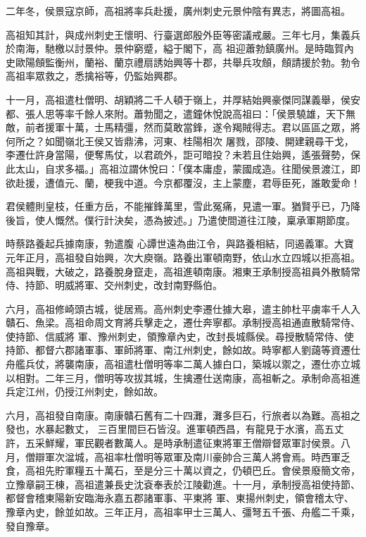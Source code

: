 \begin{pinyinscope}
 二年冬，侯景寇京師，高祖將率兵赴援，廣州刺史元景仲陰有異志，將圖高祖。



 高祖知其計，與成州刺史王懷明、行臺選郎殷外臣等密議戒嚴。三年七月，集義兵於南海，馳檄以討景仲。景仲窮蹙，縊于閣下，高
 祖迎蕭勃鎮廣州。是時臨賀內史歐陽頠監衡州，蘭裕、蘭京禮扇誘始興等十郡，共舉兵攻頠，頠請援於勃。勃令高祖率眾救之，悉擒裕等，仍監始興郡。



 十一月，高祖遣杜僧明、胡穎將二千人頓于嶺上，并厚結始興豪傑同謀義舉，侯安都、張人思等率千餘人來附。蕭勃聞之，遣鐘休悅說高祖曰：「侯景驍雄，天下無敵，前者援軍十萬，士馬精彊，然而莫敢當鋒，遂令羯賊得志。君以區區之眾，將何所之？如聞嶺北王侯又皆鼎沸，河東、桂陽相次
 屠戮，邵陵、開建親尋干戈，李遷仕許身當陽，便奪馬仗，以君疏外，詎可暗投？未若且住始興，遙張聲勢，保此太山，自求多福。」高祖泣謂休悅曰：「僕本庸虛，蒙國成造。往聞侯景渡江，即欲赴援，遭值元、蘭，梗我中道。今京都覆沒，主上蒙塵，君辱臣死，誰敢愛命！



 君侯體則皇枝，任重方岳，不能摧鋒萬里，雪此冤痛，見遣一軍。猶賢乎已，乃降後旨，使人慨然。僕行計決矣，憑為披述。」乃遣使間道往江陵，稟承軍期節度。



 時蔡路養起兵據南康，勃遣腹
 心譚世遠為曲江令，與路養相結，同遏義軍。大寶元年正月，高祖發自始興，次大庾嶺。路養出軍頓南野，依山水立四城以拒高祖。高祖與戰，大破之，路養脫身竄走，高祖進頓南康。湘東王承制授高祖員外散騎常侍、持節、明威將軍、交州刺史，改封南野縣伯。



 六月，高祖修崎頭古城，徙居焉。高州刺史李遷仕據大皋，遣主帥杜平虜率千人入贛石、魚梁。高祖命周文育將兵擊走之，遷仕奔寧都。承制授高祖通直散騎常侍、使持節、信威將
 軍、豫州刺史，領豫章內史，改封長城縣侯。尋授散騎常侍、使持節、都督六郡諸軍事、軍師將軍、南江州刺史，餘如故。時寧都人劉藹等資遷仕舟艦兵仗，將襲南康，高祖遣杜僧明等率二萬人據白口，築城以禦之，遷仕亦立城以相對。二年三月，僧明等攻拔其城，生擒遷仕送南康，高祖斬之。承制命高祖進兵定江州，仍授江州刺史，餘如故。



 六月，高祖發自南康。南康贛石舊有二十四灘，灘多巨石，行旅者以為難。高祖之發也，水暴起數丈，
 三百里間巨石皆沒。進軍頓西昌，有龍見于水濱，高五丈許，五采鮮耀，軍民觀者數萬人。是時承制遣征東將軍王僧辯督眾軍討侯景。八月，僧辯軍次湓城，高祖率杜僧明等眾軍及南川豪帥合三萬人將會焉。時西軍乏食，高祖先貯軍糧五十萬石，至是分三十萬以資之，仍頓巴丘。會侯景廢簡文帝，立豫章嗣王棟，高祖遣兼長史沈袞奉表於江陵勸進。十一月，承制授高祖使持節、都督會稽東陽新安臨海永嘉五郡諸軍事、平東將
 軍、東揚州刺史，領會稽太守、豫章內史，餘並如故。三年正月，高祖率甲士三萬人、彊弩五千張、舟艦二千乘，發自豫章。




\end{pinyinscope}
